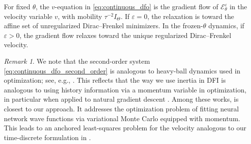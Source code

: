 \documentclass[oneside,11pt]{article}
\theoremstyle{remark}
\newtheorem{remark}{Remark}
\theoremstyle{thmstyleone}
\theoremstyle{thmstylethree}
\theoremstyle{thmstyletwo}
\newcommand{\mcE}{\mathcal{E}}
\begin{document}
  For fixed $\theta$, the $v$-equation in \eqref{eq:continuous_dfo} is the gradient flow of $\mcE_\theta^\varepsilon$ in the velocity variable $v$, with mobility $\tau^{-2}I_\Theta$.
       If $\varepsilon=0$, the relaxation is toward the affine set of unregularized Dirac--Frenkel minimizers. In the frozen-$\theta$ dynamics, if $\varepsilon>0$, the gradient flow relaxes toward the unique regularized Dirac--Frenkel velocity. 
       
       \begin{remark}We note that the second-order system \eqref{eq:continuous_dfo_second_order} is analogous to heavy-ball dynamics used in optimization; see, e.g., \cite{POLYAK19641,doi:10.1142/S0219199700000025}. 
       This reflects that the way we use inertia in DFI is analogous to using history information via a momentum variable in optimization, in particular when applied to natural gradient descent \cite{pmlr-v202-muller23b,GOLDSHLAGER2024113351,guzman-cordero2025improving,nouy2026naturalgradientdescentmomentum}. Among these works,  \cite{GOLDSHLAGER2024113351} is closest to our approach. It addresses the optimization problem of fitting neural network wave functions via variational Monte Carlo equipped with momentum. This leads to an anchored least-squares problem for the velocity analogous to our time-discrete formulation in . 
       \end{remark}
       
\end{document}
